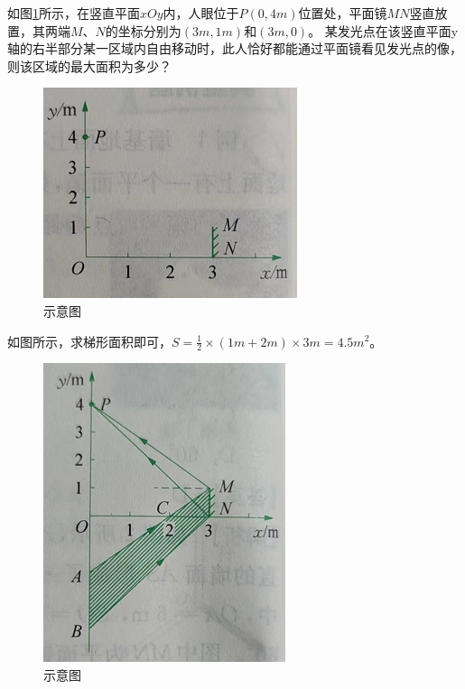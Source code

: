 \documentclass[windows,csize4, answers]{BHCexam}
\begin{document}
\begin{groups}
\begin{questions}[]
        \question[5]如图\ref{fig:fig_3_13}所示，在竖直平面$xOy$内，人眼位于$P(0,4m)$位置处，平面镜$MN$竖直放置，其两端$M$、$N$的坐标分别为$(3m,1m)$和$(3m,0)$。
        某发光点在该竖直平面y轴的右半部分某一区域内自由移动时，此人恰好都能通过平面镜看见发光点的像，则该区域的最大面积为多少？
        \begin{figure}[htb]
            \centering
            \includegraphics [scale=0.5,trim=0 0 0 0]{./image/fig_3_13.PNG}
            \caption{示意图}
            \label{fig:fig_3_13}
        \end{figure}
        \begin{solution}{0.5cm}
            \methodonly  如图所示，求梯形面积即可，$S=\frac{1}{2}\times (1m+2m)\times 3m=4.5m^2$。
            \begin{figure}[htb]
                \centering
                \includegraphics [scale=0.5,trim=0 0 0 0]{./image/fig_3_14.PNG}
                \caption{示意图}
                \label{fig:fig_3_14}
            \end{figure}
        \end{solution}
        \vspace{3cm}



\end{questions}
\end{groups}
\end{document}
